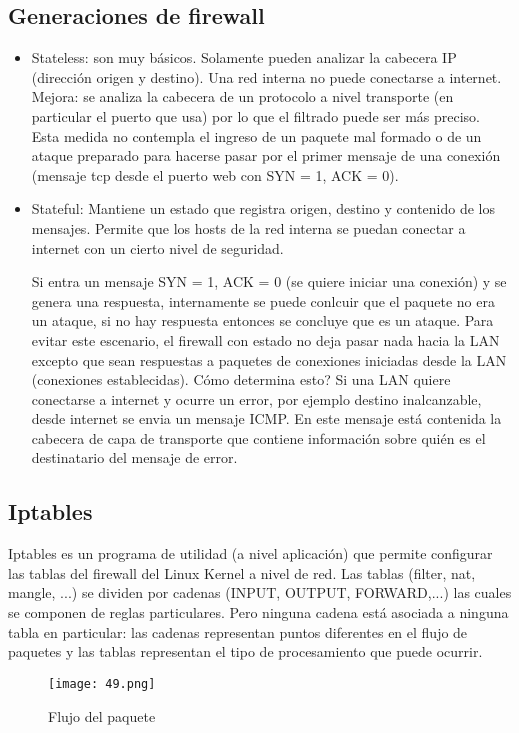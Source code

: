 \documentclass{book}
\begin{document}
	
	\pagebreak
	\subsection{Generaciones de firewall}
	\begin{itemize}
		\item Stateless: son muy básicos. Solamente pueden analizar la cabecera IP (dirección origen y destino). Una red interna no puede conectarse a internet. Mejora: se analiza la cabecera de un protocolo a nivel transporte (en particular el puerto que usa) por lo que el filtrado puede ser más preciso. Esta medida no contempla el ingreso de un paquete mal formado o de un ataque preparado para hacerse pasar por el primer mensaje de una conexión (mensaje tcp desde el puerto web con SYN = 1, ACK = 0).
		\item Stateful: Mantiene un estado que registra origen, destino y contenido de los mensajes. Permite que los hosts de la red interna se puedan conectar a internet con un cierto nivel de seguridad.
		
		Si entra un mensaje SYN = 1, ACK = 0 (se quiere iniciar una conexión) y se genera una respuesta, internamente se puede conlcuir que el paquete no era un ataque, si no hay respuesta entonces se concluye que es un ataque. Para evitar este escenario, el firewall con estado no deja pasar nada hacia la LAN excepto que sean respuestas a paquetes de conexiones iniciadas desde la LAN (conexiones establecidas). Cómo determina esto? Si una LAN quiere conectarse a internet y ocurre un error, por ejemplo destino inalcanzable, desde internet se envia un mensaje ICMP. En este mensaje está contenida la cabecera de capa de transporte que contiene información sobre quién es el destinatario del mensaje de error.
	\end{itemize}
	
	\subsection{Iptables}
	Iptables es un programa de utilidad (a nivel aplicación) que permite configurar las tablas del firewall del Linux Kernel a nivel de red. Las tablas (filter, nat, mangle, ...) se dividen por cadenas (INPUT, OUTPUT, FORWARD,...) las cuales se componen de reglas particulares. Pero ninguna cadena está asociada a ninguna tabla en particular: las cadenas representan puntos diferentes en el flujo de paquetes y las tablas representan el tipo de procesamiento que puede ocurrir.
	
	\begin{figure}[H]
		\centering
		\texttt{[image: 49.png]}
		\caption{Flujo del paquete}
	\end{figure}
	
\end{document}
